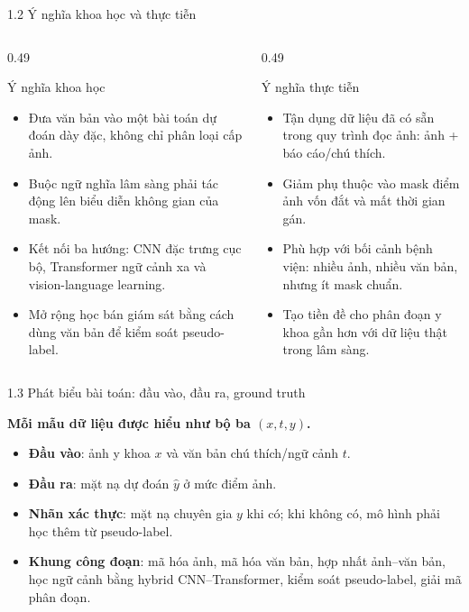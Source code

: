 \documentclass[aspectratio=169,11pt]{beamer}
\newcommand{\reportclaim}[1]{%
  \vspace{0.08cm}
  {\large\bfseries\color{accentblue}#1\par}
  \vspace{0.06cm}
}
\begin{document}
\begin{frame}{1.2 Ý nghĩa khoa học và thực tiễn}
  \begin{columns}[T,totalwidth=\textwidth]
    \begin{column}{0.49\textwidth}
      \begin{block}{Ý nghĩa khoa học}
        \begin{itemize}
          \item Đưa văn bản vào một bài toán dự đoán dày đặc, không chỉ phân loại cấp ảnh.
          \item Buộc ngữ nghĩa lâm sàng phải tác động lên biểu diễn không gian của mask.
          \item Kết nối ba hướng: CNN đặc trưng cục bộ, Transformer ngữ cảnh xa và vision-language learning.
          \item Mở rộng học bán giám sát bằng cách dùng văn bản để kiểm soát pseudo-label.
        \end{itemize}
      \end{block}
    \end{column}
    \begin{column}{0.49\textwidth}
      \begin{block}{Ý nghĩa thực tiễn}
        \begin{itemize}
          \item Tận dụng dữ liệu đã có sẵn trong quy trình đọc ảnh: ảnh + báo cáo/chú thích.
          \item Giảm phụ thuộc vào mask điểm ảnh vốn đắt và mất thời gian gán.
          \item Phù hợp với bối cảnh bệnh viện: nhiều ảnh, nhiều văn bản, nhưng ít mask chuẩn.
          \item Tạo tiền đề cho phân đoạn y khoa gần hơn với dữ liệu thật trong lâm sàng.
        \end{itemize}
      \end{block}
    \end{column}
  \end{columns}
\end{frame}

\begin{frame}{1.3 Phát biểu bài toán: đầu vào, đầu ra, ground truth}
  \reportclaim{Mỗi mẫu dữ liệu được hiểu như bộ ba \((x,t,y)\).}
  \begin{itemize}
    \item \textbf{Đầu vào}: ảnh y khoa \(x\) và văn bản chú thích/ngữ cảnh \(t\).
    \item \textbf{Đầu ra}: mặt nạ dự đoán \(\hat{y}\) ở mức điểm ảnh.
    \item \textbf{Nhãn xác thực}: mặt nạ chuyên gia \(y\) khi có; khi không có, mô hình phải học thêm từ pseudo-label.
    \item \textbf{Khung công đoạn}: mã hóa ảnh, mã hóa văn bản, hợp nhất ảnh--văn bản, học ngữ cảnh bằng hybrid CNN--Transformer, kiểm soát pseudo-label, giải mã phân đoạn.
  \end{itemize}
\end{frame}
\end{document}
